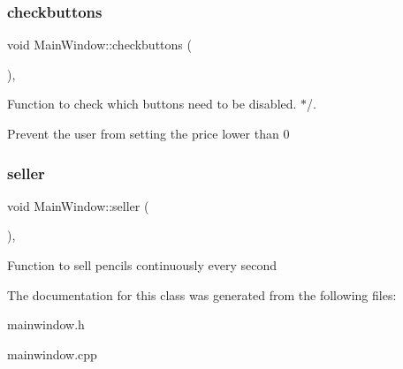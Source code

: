 \subsubsection{\texorpdfstring{checkbuttons}{checkbuttons}}
{\footnotesize\ttfamily void Main\+Window\+::checkbuttons (\begin{DoxyParamCaption}{ }\end{DoxyParamCaption})\hspace{0.3cm}{\ttfamily [private]}, {\ttfamily [slot]}}



Function to check which buttons need to be disabled. $\ast$/. 

Prevent the user from setting the price lower than 0 \mbox{\label{classMainWindow_a4dc23fc3239af6ef699297e092f833cd}} 
\subsubsection{\texorpdfstring{seller}{seller}}
{\footnotesize\ttfamily void Main\+Window\+::seller (\begin{DoxyParamCaption}{ }\end{DoxyParamCaption})\hspace{0.3cm}{\ttfamily [private]}, {\ttfamily [slot]}}

Function to sell pencils continuously every second 

The documentation for this class was generated from the following files\+:\begin{DoxyCompactItemize}
\item 
mainwindow.\+h\item 
mainwindow.\+cpp\end{DoxyCompactItemize}
